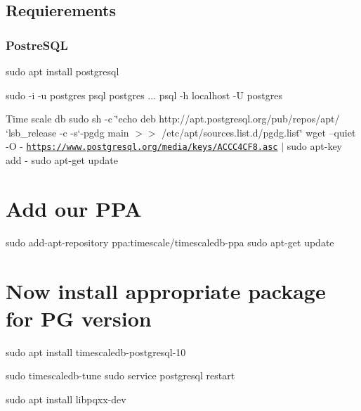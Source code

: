 \subsection*{Requierements}

\subsubsection*{Postre\+S\+QL}

sudo apt install postgresql

sudo -\/i -\/u postgres psql  postgres ... psql -\/h localhost -\/U postgres

Time scale db sudo sh -\/c \char`\"{}echo \textquotesingle{}deb http\+://apt.\+postgresql.\+org/pub/repos/apt/ `lsb\+\_\+release -\/c -\/s`-\/pgdg main\textquotesingle{} $>$$>$ /etc/apt/sources.\+list.\+d/pgdg.\+list\char`\"{} wget --quiet -\/O -\/ \href{https://www.postgresql.org/media/keys/ACCC4CF8.asc}{\tt https\+://www.\+postgresql.\+org/media/keys/\+A\+C\+C\+C4\+C\+F8.\+asc} $\vert$ sudo apt-\/key add -\/ sudo apt-\/get update

\section*{Add our P\+PA}

sudo add-\/apt-\/repository ppa\+:timescale/timescaledb-\/ppa sudo apt-\/get update

\section*{Now install appropriate package for PG version}

sudo apt install timescaledb-\/postgresql-\/10

sudo timescaledb-\/tune sudo service postgresql restart

sudo apt install libpqxx-\/dev 